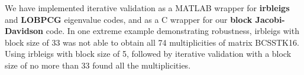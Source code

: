 \documentclass{report}
\begin{document}
We have implemented iterative validation as a MATLAB wrapper for
{\bf irbleigs} and {\bf LOBPCG} eigenvalue codes, and as a C
wrapper for our {\bf block Jacobi-Davidson} code.
In one extreme example demonstrating robustness, irbleigs with block
size of 33 was not able to obtain all 74 multiplicities of matrix BCSSTK16.
Using irbleigs with block size of 5, followed by iterative validation with
a block size of no more than 33 found all the multiplicities.
\end{document}
